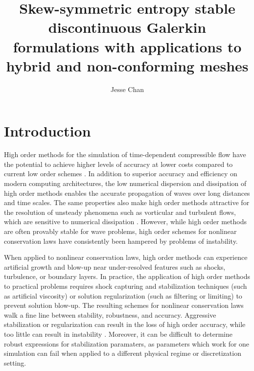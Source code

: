 \documentclass[review]{siamart0216}
\date{}
\author{Jesse Chan}%
\title{Skew-symmetric entropy stable discontinuous Galerkin formulations with applications to hybrid and non-conforming meshes}
\theoremstyle{assumption}
\begin{document}
\maketitle

%
%


\section{Introduction}

High order methods for the simulation of time-dependent compressible flow have the potential to achieve higher levels of accuracy at lower costs compared to current low order schemes \cite{wang2013high}.  In addition to superior accuracy and efficiency on modern computing architectures, the low numerical dispersion and dissipation of high order methods \cite{ainsworth2004dispersive} enables the accurate propagation of waves over long distances and time scales.  The same properties also make high order methods attractive for the resolution of unsteady phenomena such as vorticular and turbulent flows, which are sensitive to numerical dissipation \cite{visbal1999high, wang2013high}.  However, while high order methods are often provably stable for wave problems, high order schemes for nonlinear conservation laws have consistently been hampered by problems of instability.  

When applied to nonlinear conservation laws, high order methods can experience artificial growth and blow-up near under-resolved features such as shocks, turbulence, or boundary layers.  In practice, the application of high order methods to practical problems requires shock capturing and stabilization techniques (such as artificial viscosity) or solution regularization (such as filtering or limiting) to prevent solution blow-up.  The resulting schemes for nonlinear conservation laws walk a fine line between stability, robustness, and accuracy.  Aggressive stabilization or regularization can result in the loss of high order accuracy, while too little can result in instability \cite{wang2013high}.  Moreover, it can be difficult to determine robust expressions for stabilization paramaters, as parameters which work for one simulation can fail when applied to a different physical regime or discretization setting.  
\end{document}

